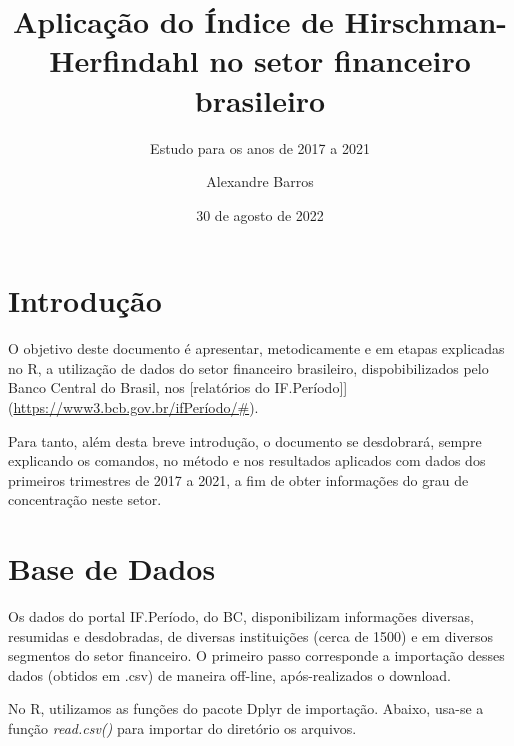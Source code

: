 \documentclass[
]{article}
\title{Aplicação do Índice de Hirschman-Herfindahl no setor financeiro
brasileiro}
\subtitle{Estudo para os anos de 2017 a 2021}
\author{Alexandre Barros}
\date{30 de agosto de 2022}
\begin{document}
\maketitle

\hypertarget{introduuxe7uxe3o}{%
\section{Introdução}\label{introduuxe7uxe3o}}

O objetivo deste documento é apresentar, metodicamente e em etapas
explicadas no R, a utilização de dados do setor financeiro brasileiro,
dispobibilizados pelo Banco Central do Brasil, nos {[}relatórios do
IF.Período{]}{]}(\url{https://www3.bcb.gov.br/ifPeríodo/\#}).

Para tanto, além desta breve introdução, o documento se desdobrará,
sempre explicando os comandos, no método e nos resultados aplicados com
dados dos primeiros trimestres de 2017 a 2021, a fim de obter
informações do grau de concentração neste setor.

\hypertarget{base-de-dados}{%
\section{Base de Dados}\label{base-de-dados}}

Os dados do portal IF.Período, do BC, disponibilizam informações
diversas, resumidas e desdobradas, de diversas instituições (cerca de
1500) e em diversos segmentos do setor financeiro. O primeiro passo
corresponde a importação desses dados (obtidos em .csv) de maneira
off-line, após-realizados o download.

No R, utilizamos as funções do pacote Dplyr de importação. Abaixo,
usa-se a função \emph{read.csv()} para importar do diretório os
arquivos.
\end{document}

